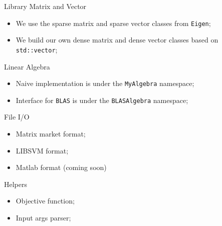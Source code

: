 \documentclass[hyperref,handout,compress,9pt,mathserif]{beamer}
\begin{document}
\begin{frame}{Library}
Matrix and Vector
\begin{itemize}
\item We use the sparse matrix and sparse vector classes from \texttt{Eigen};
\item We build our own dense matrix and dense vector classes based on \texttt{std::vector};
\end{itemize}

Linear Algebra
\begin{itemize}
\item Naive implementation is under the \texttt{MyAlgebra} namespace;
\item Interface for \texttt{BLAS} is under the \texttt{BLASAlgebra} namespace;
\end{itemize}

File I/O
\begin{itemize}
\item Matrix market format;
\item LIBSVM format;
\item Matlab format (coming soon)
\end{itemize}

Helpers
\begin{itemize}
\item Objective function;
\item Input args parser;
\end{itemize}
\end{frame}
\end{document}
